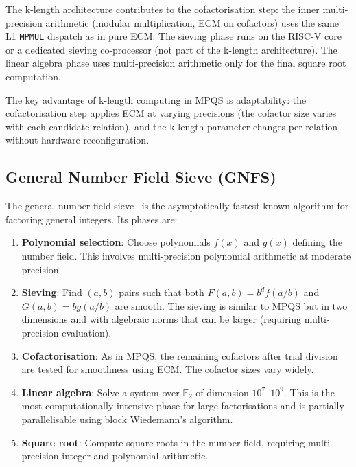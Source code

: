 \documentclass[11pt,a4paper]{article}
\begin{document}
The k-length architecture contributes to the cofactorisation step: the inner
multi-precision arithmetic (modular multiplication, ECM on cofactors) uses
the same L1 \texttt{MPMUL} dispatch as in pure ECM.  The sieving phase runs
on the RISC-V core or a dedicated sieving co-processor (not part of the
k-length architecture).  The linear algebra phase uses multi-precision
arithmetic only for the final square root computation.

The key advantage of k-length computing in MPQS is adaptability: the
cofactorisation step applies ECM at varying precisions (the cofactor size
varies with each candidate relation), and the k-length parameter changes
per-relation without hardware reconfiguration.

\subsection{General Number Field Sieve (GNFS)}
\label{sec:gnfs}

The general number field sieve~\cite{lenstra1993gnfs} is the asymptotically
fastest known algorithm for factoring general integers.  Its phases are:

\begin{enumerate}[leftmargin=*]
  \item \textbf{Polynomial selection}: Choose polynomials $f(x)$ and $g(x)$
    defining the number field.  This involves multi-precision polynomial
    arithmetic at moderate precision.

  \item \textbf{Sieving}: Find $(a,b)$ pairs such that both
    $F(a,b) = b^d f(a/b)$ and $G(a,b) = b g(a/b)$ are smooth.  The sieving
    is similar to MPQS but in two dimensions and with algebraic norms that
    can be larger (requiring multi-precision evaluation).

  \item \textbf{Cofactorisation}: As in MPQS, the remaining cofactors after
    trial division are tested for smoothness using ECM.  The cofactor sizes
    vary widely.

  \item \textbf{Linear algebra}: Solve a system over $\mathbb{F}_2$ of
    dimension $10^7$--$10^9$.  This is the most computationally intensive
    phase for large factorisations and is partially parallelisable using
    block Wiedemann's algorithm.

  \item \textbf{Square root}: Compute square roots in the number field,
    requiring multi-precision integer and polynomial arithmetic.
\end{enumerate}
\end{document}
